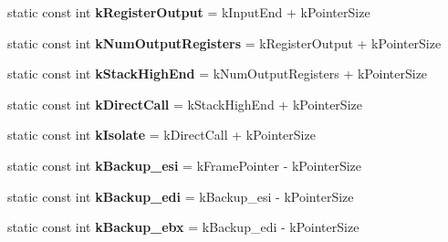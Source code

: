 \begin{DoxyCompactItemize}
\item 
static const int {\bfseries k\+Register\+Output} = k\+Input\+End + k\+Pointer\+Size\hypertarget{classv8_1_1internal_1_1_reg_exp_macro_assembler_x87_a382274209d32b349dc0d927c3aace6cd}{}\label{classv8_1_1internal_1_1_reg_exp_macro_assembler_x87_a382274209d32b349dc0d927c3aace6cd}

\item 
static const int {\bfseries k\+Num\+Output\+Registers} = k\+Register\+Output + k\+Pointer\+Size\hypertarget{classv8_1_1internal_1_1_reg_exp_macro_assembler_x87_adf7d8b9d986af62b625e28f499c73b7d}{}\label{classv8_1_1internal_1_1_reg_exp_macro_assembler_x87_adf7d8b9d986af62b625e28f499c73b7d}

\item 
static const int {\bfseries k\+Stack\+High\+End} = k\+Num\+Output\+Registers + k\+Pointer\+Size\hypertarget{classv8_1_1internal_1_1_reg_exp_macro_assembler_x87_a641b9e190f6010644578597419f65aed}{}\label{classv8_1_1internal_1_1_reg_exp_macro_assembler_x87_a641b9e190f6010644578597419f65aed}

\item 
static const int {\bfseries k\+Direct\+Call} = k\+Stack\+High\+End + k\+Pointer\+Size\hypertarget{classv8_1_1internal_1_1_reg_exp_macro_assembler_x87_a5c0e001674bc19f95f46ee191c7ce030}{}\label{classv8_1_1internal_1_1_reg_exp_macro_assembler_x87_a5c0e001674bc19f95f46ee191c7ce030}

\item 
static const int {\bfseries k\+Isolate} = k\+Direct\+Call + k\+Pointer\+Size\hypertarget{classv8_1_1internal_1_1_reg_exp_macro_assembler_x87_abed06ad7370c836e733953b5cff1367b}{}\label{classv8_1_1internal_1_1_reg_exp_macro_assembler_x87_abed06ad7370c836e733953b5cff1367b}

\item 
static const int {\bfseries k\+Backup\+\_\+esi} = k\+Frame\+Pointer -\/ k\+Pointer\+Size\hypertarget{classv8_1_1internal_1_1_reg_exp_macro_assembler_x87_a3bb9966aa5df735919bf9da806bf53d5}{}\label{classv8_1_1internal_1_1_reg_exp_macro_assembler_x87_a3bb9966aa5df735919bf9da806bf53d5}

\item 
static const int {\bfseries k\+Backup\+\_\+edi} = k\+Backup\+\_\+esi -\/ k\+Pointer\+Size\hypertarget{classv8_1_1internal_1_1_reg_exp_macro_assembler_x87_ac75c28d2d21f83ae326dc27a1f005bbf}{}\label{classv8_1_1internal_1_1_reg_exp_macro_assembler_x87_ac75c28d2d21f83ae326dc27a1f005bbf}

\item 
static const int {\bfseries k\+Backup\+\_\+ebx} = k\+Backup\+\_\+edi -\/ k\+Pointer\+Size\hypertarget{classv8_1_1internal_1_1_reg_exp_macro_assembler_x87_a36db52a79fbf08fab02f929cee5687a5}{}\label{classv8_1_1internal_1_1_reg_exp_macro_assembler_x87_a36db52a79fbf08fab02f929cee5687a5}


\end{DoxyCompactItemize}
